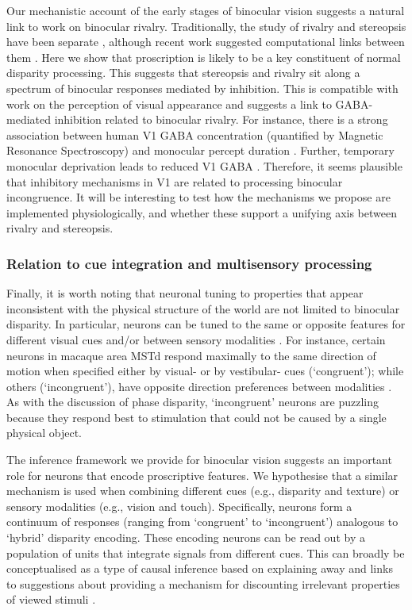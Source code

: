 Our mechanistic account of the early stages of binocular vision suggests a natural link to work on binocular rivalry. Traditionally, the study of rivalry and stereopsis have been separate \cite{Blake:2011bb, Blake:2012wr}, although recent work suggested computational links between them \cite{Muryy:2014hk}. Here we show that proscription is likely to be a key constituent of normal disparity processing. This suggests that stereopsis and rivalry sit along a spectrum of binocular responses mediated by inhibition. This is compatible with work on the perception of visual appearance \cite{Muryy:2016km} and suggests a link to GABA-mediated inhibition related to binocular rivalry. For instance, there is a strong association between human V1 GABA concentration (quantified by Magnetic Resonance Spectroscopy) and monocular percept duration \cite{vanLoon:2013da}. Further, temporary monocular deprivation leads to reduced V1 GABA \cite{Lunghi:2015fc}. Therefore, it seems plausible that inhibitory mechanisms in V1 are related to processing binocular incongruence. It will be interesting to test how the mechanisms we propose are implemented physiologically, and whether these support a unifying axis between rivalry and stereopsis.

\subsubsection*{Relation to cue integration and multisensory processing}


Finally, it is worth noting that neuronal tuning to properties that appear inconsistent with the physical structure of the world are not limited to binocular disparity. In particular, neurons can be tuned to the same or opposite features for different visual cues and/or between sensory modalities \cite{Nadler:2008ha, Kim:2014ic, Morgan:2008fh}. For instance, certain neurons in macaque area MSTd respond maximally to the same direction of motion when specified either by visual- or by vestibular- cues (`congruent'); while others (`incongruent'), have opposite direction preferences between modalities \cite{Morgan:2008fh}. As with the discussion of phase disparity, `incongruent' neurons are puzzling because they respond best to stimulation that could not be caused by a single physical object.  

 The inference framework we provide for binocular vision suggests an important role for neurons that encode proscriptive features. We hypothesise that a similar mechanism is used when combining different cues (e.g., disparity and texture) or sensory modalities (e.g., vision and touch). Specifically, neurons form a continuum of responses (ranging from `congruent' to `incongruent') analogous to `hybrid' disparity encoding. These encoding neurons can be read out by a population of units that integrate signals from different cues. This can broadly be conceptualised as a type of causal inference based on explaining away \cite {Wellman:1993el} and links to suggestions about providing a mechanism for discounting irrelevant properties of viewed stimuli \cite{Kim:2016hd}.

